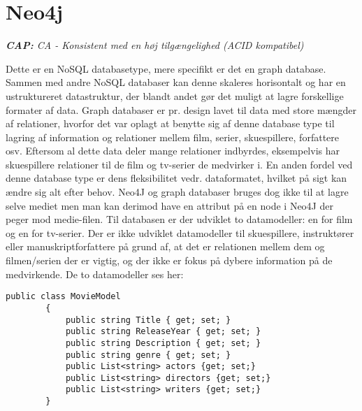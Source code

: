 \section{Neo4j}
\begin{displayquote}
    \textit{\textbf{CAP:} CA - Konsistent med en høj tilgængelighed (ACID kompatibel)}
\end{displayquote}

Dette er en NoSQL databasetype, mere specifikt er det en graph database. Sammen med andre NoSQL databaser kan denne skaleres horisontalt og har en ustruktureret datastruktur, der blandt andet gør det muligt at lagre forskellige formater af data. Graph databaser er pr. design lavet til data med store mængder af relationer, hvorfor det var oplagt at benytte sig af denne database type til lagring af information og relationer mellem film, serier, skuespillere, forfattere osv. Eftersom al dette data deler mange relationer indbyrdes, eksempelvis har skuespillere relationer til de film og tv-serier de medvirker i. En anden fordel ved denne database type er dens fleksibilitet vedr. dataformatet, hvilket på sigt kan ændre sig alt efter behov. Neo4J og graph databaser bruges dog ikke til at lagre selve mediet men man kan derimod have en attribut på en node i Neo4J der peger mod medie-filen.
\bigbreak
Til databasen er der udviklet to datamodeller: en for film og en for tv-serier. Der er ikke udviklet datamodeller til skuespillere, instruktører eller manuskriptforfattere på grund af, at det er relationen mellem dem og filmen/serien der er vigtig, og der ikke er fokus på dybere information på de medvirkende. De to datamodeller ses her:
\begin{tcolorbox}
    \lstset{style=sharpstyle}
    \begin{lstlisting}[language={[Sharp]C}, caption={Logs HBASE Model}, label={lst:log}]
        public class MovieModel
        {
            public string Title { get; set; }
            public string ReleaseYear { get; set; }
            public string Description { get; set; }
            public string genre { get; set; }
            public List<string> actors {get; set;}
            public List<string> directors {get; set;}
            public List<string> writers {get; set;}
        }
    \end{lstlisting}
\end{tcolorbox}

